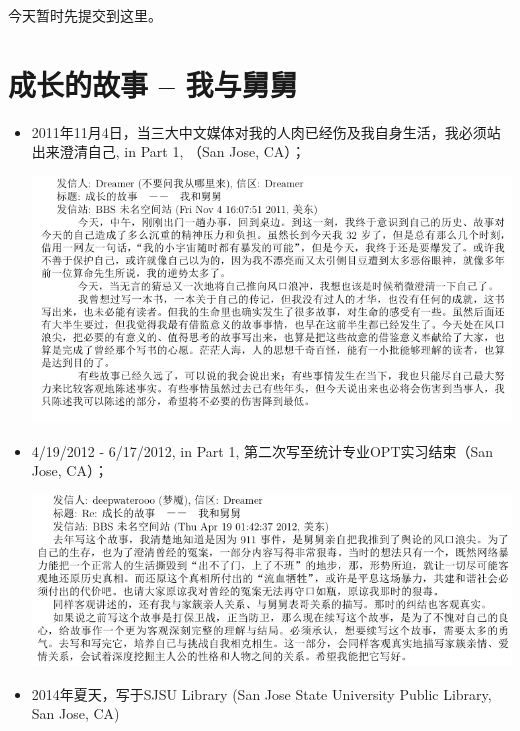 \documentclass[9pt, b5paper]{article}
\begin{document}
今天暂时先提交到这里。

\section{成长的故事 -- 我与舅舅}
\label{sec-2}
\begin{itemize}
\item 2011年11月4日，当三大中文媒体对我的人肉已经伤及我自身生活，我必须站出来澄清自己, in Part 1, （San Jose, CA）；

\includegraphics[width=.9\linewidth]{./pic/dreamer1.png}
\item 4/19/2012 - 6/17/2012, in Part 1, 第二次写至统计专业OPT实习结束（San Jose, CA）；

\includegraphics[width=.9\linewidth]{./pic/dreamer2.png}
\item 2014年夏天，写于SJSU Library (San Jose State University Public Library, San Jose, CA)


\end{itemize}
\end{document}

